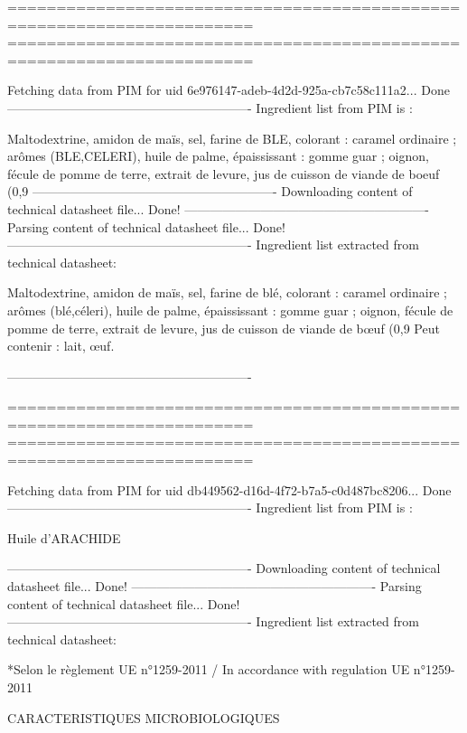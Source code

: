 \begin{spacing}{1.0}
{{\begin{spverbatim}
=======================================================================
=======================================================================

Fetching data from PIM for uid 6e976147-adeb-4d2d-925a-cb7c58c111a2...
Done
----------------------------------------------------------
Ingredient list from PIM is :

Maltodextrine, amidon de maïs, sel, farine de BLE, colorant : caramel ordinaire ; arômes (BLE,CELERI), huile de palme, épaississant : gomme guar ; oignon, fécule de pomme de terre, extrait de levure, jus de cuisson de viande de boeuf (0,9%
----------------------------------------------------------
Downloading content of technical datasheet file...
Done!
----------------------------------------------------------
Parsing content of technical datasheet file...
Done!
----------------------------------------------------------
Ingredient list extracted from technical datasheet:

Maltodextrine, amidon de maïs, sel, farine de blé, colorant : caramel ordinaire ; arômes (blé,céleri), huile de palme, épaississant : gomme guar ; oignon, fécule 
de pomme de terre, extrait de levure, jus de cuisson de viande de bœuf (0,9%
Peut contenir : lait, œuf.

----------------------------------------------------------

=======================================================================
=======================================================================

Fetching data from PIM for uid db449562-d16d-4f72-b7a5-c0d487bc8206...
Done
----------------------------------------------------------
Ingredient list from PIM is :

Huile d'ARACHIDE

----------------------------------------------------------
Downloading content of technical datasheet file...
Done!
----------------------------------------------------------
Parsing content of technical datasheet file...
Done!
----------------------------------------------------------
Ingredient list extracted from technical datasheet:

*Selon le règlement UE n°1259-2011 / In accordance with regulation UE n°1259-2011  
    
    
CARACTERISTIQUES MICROBIOLOGIQUES 
    

\end{spverbatim}}}
\end{spacing}
